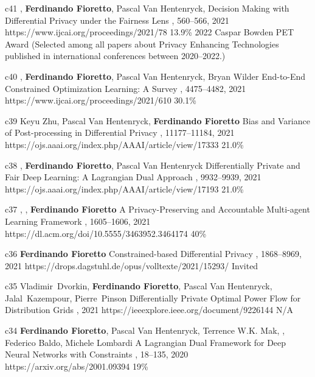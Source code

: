 \begin{pubs}
	\confentryAwd 
	{c41} %
	{, {\bf Ferdinando Fioretto}, Pascal Van Hentenryck, }
	{Decision Making with Differential Privacy under the Fairness Lens}
	{\procIJCAI, 560--566, 2021}
	{https://www.ijcai.org/proceedings/2021/78}
	{13.9\%} %
	{2022 Caspar Bowden PET Award}
	{(Selected among all papers about Privacy Enhancing Technologies published in international conferences between 2020--2022.)}

	\confentry 
	{c40} %
	{, {\bf Ferdinando Fioretto}, Pascal Van Hentenryck, Bryan Wilder}
	{End-to-End Constrained Optimization Learning: A Survey}
	{\procIJCAI, 4475--4482, 2021}
	{https://www.ijcai.org/proceedings/2021/610}
	{30.1\%}

	\confentry 
	{c39} %
	{Keyu Zhu, Pascal Van Hentenryck, {\bf Ferdinando Fioretto}}
	{Bias and Variance of Post-processing in Differential Privacy}
	{\procAAAI, 11177--11184, 2021}
	{https://ojs.aaai.org/index.php/AAAI/article/view/17333}
    {21.0\%} %

	\confentry 
	{c38} %
	{, {\bf Ferdinando Fioretto}, Pascal Van Hentenryck}
	{Differentially Private and Fair Deep Learning: A Lagrangian Dual Approach}
	{\procAAAI, 9932--9939, 2021}
	{https://ojs.aaai.org/index.php/AAAI/article/view/17193}
    {21.0\%} %

    \confentry
    {c37} %
    {, , {\bf Ferdinando Fioretto}}
    {A Privacy-Preserving and Accountable Multi-agent Learning Framework}
    {\procAAMAS, 1605--1606, 2021}
    {https://dl.acm.org/doi/10.5555/3463952.3464174}
    {40\%}

	\confentry
	{c36} %
	{\bf Ferdinando Fioretto}
	{Constrained-based Differential Privacy}
	{\procCP, 1868--8969, 2021}
	{https://drops.dagstuhl.de/opus/volltexte/2021/15293/}
	{Invited}
	
	\confentry 
	{c35} %
	{Vladimir~Dvorkin, {\bf Ferdinando Fioretto}, Pascal Van Hentenryck, Jalal~Kazempour, Pierre~Pinson}
	{Differentially Private Optimal Power Flow for Distribution Grids}
	{, 2021}
	{https://ieeexplore.ieee.org/document/9226144}
	{N/A} %


	\confentry
		{c34} %
		{{\bf Ferdinando Fioretto}, Pascal Van Hentenryck, Terrence W.K. Mak, , Federico Baldo, Michele Lombardi} 
		{A Lagrangian Dual Framework for Deep Neural Networks with Constraints}
		{\procECML, 18--135, 2020}
		{https://arxiv.org/abs/2001.09394}
		{19\%}


\end{pubs}
